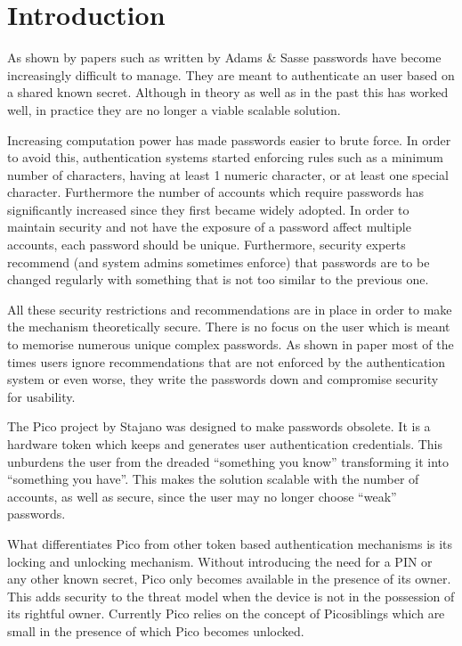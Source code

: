 
\chapter{Introduction} %

\label{Chapter1}


As shown by papers such as \cite{} written by Adams \& Sasse passwords have become increasingly difficult to manage. They are meant to authenticate an user based on a shared known secret. Although in theory as well as in the past this has worked well, in practice they are no longer a viable scalable solution. 

Increasing computation power has made passwords easier to brute force. In order to avoid this, authentication systems started enforcing rules such as a minimum number of characters, having at least 1 numeric character, or at least one special character. Furthermore the number of accounts which require passwords has significantly increased since they first became widely adopted. In order to maintain security and not have the exposure of a password affect multiple accounts, each password should be unique. Furthermore, security experts recommend (and system admins sometimes enforce) that passwords are to be changed regularly with something that is not too similar to the previous one.  

All these security restrictions and recommendations are in place in order to make the mechanism theoretically secure. There is no focus on the user which is meant to memorise numerous unique complex passwords. As shown in paper \cite{} most of the times users ignore recommendations that are not enforced by the authentication system or even worse, they write the passwords down and compromise security for usability.

The Pico project \cite{} by Stajano was designed to make passwords obsolete. It is a hardware token which keeps and generates user authentication credentials. This unburdens the user from the dreaded ``something you know'' transforming it into ``something you have''. This makes the solution scalable with the number of accounts, as well as secure, since the user may no longer choose ``weak'' passwords. 

What differentiates Pico from other token based authentication mechanisms is its locking and unlocking mechanism. Without introducing the need for a PIN or any other known secret, Pico only becomes available in the presence of its owner. This adds security to the threat model when the device is not in the possession of its rightful owner. Currently Pico relies on the concept of Picosiblings \cite{} which are small in the presence of which Pico becomes unlocked.

